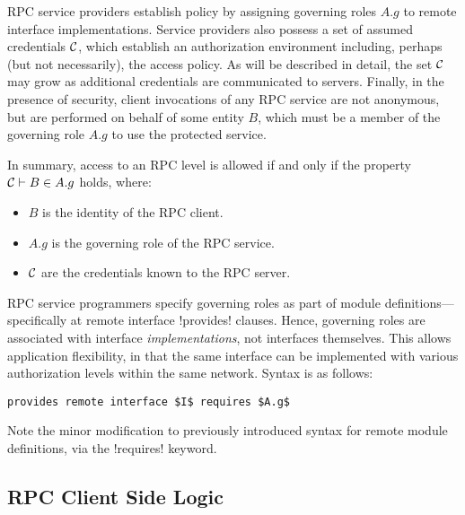 RPC service providers establish policy by assigning governing roles $A.g$ to remote interface
implementations. Service providers also possess a set of assumed credentials $\mathcal{C}$, which
establish an authorization environment including, perhaps (but not necessarily), the access
policy. As will be described in detail, the set $\mathcal{C}$ may grow as additional credentials are
communicated to servers. Finally, in the presence of security, client invocations of any RPC
service are not anonymous, but are performed on behalf of some entity $B$, which must be a
member of the governing role $A.g$ to use the protected service.

In summary, access to an RPC level is allowed if and only if the property $\mathcal{C} \vdash B \in
A.g$ holds, where:
\begin{itemize}
  \item $B$ is the identity of the RPC client.
  \item $A.g$ is the governing role of the RPC service.
  \item $\mathcal{C}$ are the credentials known to the RPC server.
\end{itemize}
RPC service programmers specify governing roles as part of module definitions---specifically at
remote interface !provides! clauses. Hence, governing roles are associated with interface
\emph{implementations}, not interfaces themselves. This allows application flexibility, in that
the same interface can be implemented with various authorization levels within the same network.
Syntax is as follows:
\begin{lstlisting}[mathescape=true]
provides remote interface $I$ requires $A.g$
\end{lstlisting}

Note the minor modification to previously introduced syntax for remote module definitions, via
the !requires! keyword.

\subsection{RPC Client Side Logic}
\label{section-rpc-client-side}

